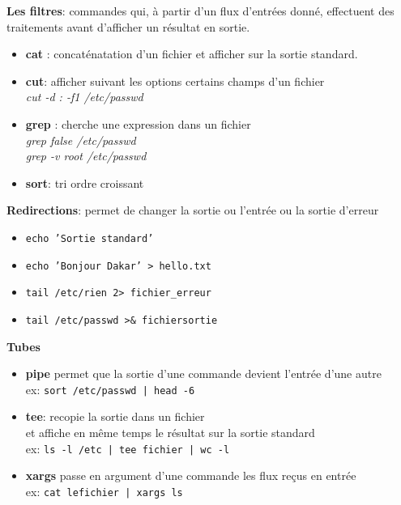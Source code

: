 \documentclass[french]{beamer}
\begin{document}
\begin{frame}
\textbf{Les filtres}: commandes qui, à partir d'un flux d'entrées donné,
effectuent des traitements avant d'afficher un résultat en sortie.
    \begin{itemize}
    \item \textbf{cat} : concaténatation d'un fichier et afficher sur la sortie
    standard. \\
    \item \textbf{cut}: afficher suivant les options certains champs d'un
    fichier \\
    \textit{cut -d : -f1 /etc/passwd}
    \item \textbf{grep} : cherche une expression dans un fichier \\
    \textit{grep false /etc/passwd} \\
    \textit{grep -v root /etc/passwd} \\
    \item \textbf{sort}: tri ordre croissant
    \end{itemize}
\end{frame}


\begin{frame}
\textbf{Redirections}: permet de changer la sortie ou l'entrée ou la sortie d'erreur \\
    \begin{itemize}
    \item \texttt{echo 'Sortie standard'}
    \item \texttt{echo 'Bonjour Dakar' > hello.txt}
    \item \texttt{tail /etc/rien 2> fichier_erreur}
    \item \texttt{tail /etc/passwd >\& fichiersortie }
    \end{itemize}
\end{frame}


\begin{frame}
\textbf{Tubes}
    \begin{itemize}
    \item \textbf{pipe} permet que la sortie d'une commande devient l'entrée
    d'une autre \\
    ex: \texttt{sort /etc/passwd | head -6}
    \item \textbf{tee}: recopie la sortie dans un fichier \\et affiche en même
    temps le résultat sur la sortie standard \\
    ex: \texttt{ls -l /etc | tee fichier | wc  -l}
    \item \textbf{xargs} passe en argument d'une commande les flux reçus en
    entrée\\
    ex: \texttt{cat lefichier | xargs ls}

    \end{itemize}
\end{frame}
\end{document}
